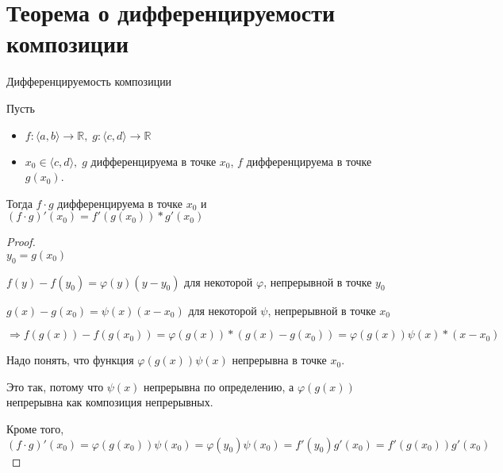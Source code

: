 \section{Теорема о дифференцируемости композиции \href{https://youtu.be/OXDjegAsmSU?t=2865}{\Walley}}
\begin{theorem-non} 
    Дифференцируемость композиции

    Пусть 
    \begin{itemize}
        \item $f: \langle a, b \rangle \to \mathbb{R}, \; g: \langle c, d \rangle \to \mathbb{R}$
        \item $x_0 \in \langle c, d \rangle, \; g$ дифференцируема в точке $x_0$, $f$ дифференцируема в точке $g(x_0)$.
    \end{itemize}

    Тогда $f \cdot g$ дифференцируема в точке $x_0$ и $(f \cdot g)'(x_0) = f'(g(x_0)) * g'(x_0)$
\end{theorem-non}
\begin{proof} \quad \\
    $y_0 = g(x_0)$

    $f(y) - f(y_0) = \varphi(y)(y - y_0)$ для некоторой $\varphi$, непрерывной в точке $y_0$

    $g(x) - g(x_0) = \psi(x)(x - x_0)$ для некоторой $\psi$, непрерывной в точке $x_0$

    $\Rightarrow f(g(x)) - f(g(x_0)) = \varphi(g(x)) * (g(x) - g(x_0)) = \varphi(g(x))\psi(x) * (x - x_0)$

    Надо понять, что функция $\varphi(g(x))\psi(x)$ непрерывна в точке $x_0$.

    Это так, потому что $\psi(x)$ непрерывна по определению, а $\varphi(g(x))$ непрерывна как композиция непрерывных.

    Кроме того, $(f \cdot g)'(x_0) = \varphi(g(x_0))\psi(x_0) = \varphi(y_0)\psi(x_0) = f'(y_0)g'(x_0) = f'(g(x_0))g'(x_0)$
\end{proof}